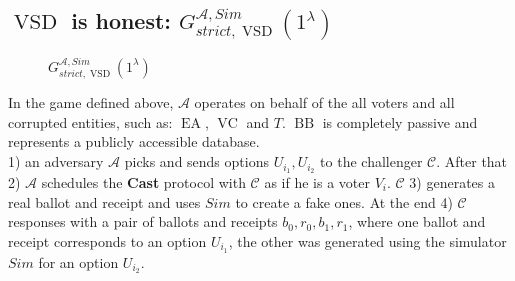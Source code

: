\documentclass[12pt]{article}
\DeclareMathOperator{\vsd}{VSD}
\DeclareMathOperator{\ea}{EA}
\DeclareMathOperator{\bb}{BB}
\DeclareMathOperator{\voc}{VC}
\begin{document}
\subsection{$\vsd$ is honest: $G_{strict,\vsd}^{\mathcal{A},Sim}(1^{\lambda})$}
  \begin{figure}[h!]
 
        \caption{ $G_{strict,\vsd}^{\mathcal{A},Sim}(1^{\lambda})$}
        \label{VSD is honest}
\end{figure}
In the game defined above, $\mathcal{A}$ operates on behalf of the all voters and all corrupted entities, such as:  $\ea$, $\voc$ and $T$. $\bb$ is completely passive and represents a publicly accessible database.\\
1) an adversary $\mathcal{A}$ picks and sends options $U_{i_1}, U_{i_2}$ to the challenger $\mathcal{C}$.  After that 2) $\mathcal{A}$ schedules the \textbf{Cast} protocol with $\mathcal{C}$  as if he is a voter $V_i$. $\mathcal{C}$ 3) generates a real ballot and receipt and uses $Sim$ to create a fake ones.  At the end 4) $\mathcal{C}$ responses with a pair of ballots and receipts $b_0,r_0,b_1,r_1$, where one ballot and receipt corresponds to an option $U_{i_1}$, the other was generated using the simulator $Sim$ for an option $U_{i_2}$. \\\\
 
\end{document}
